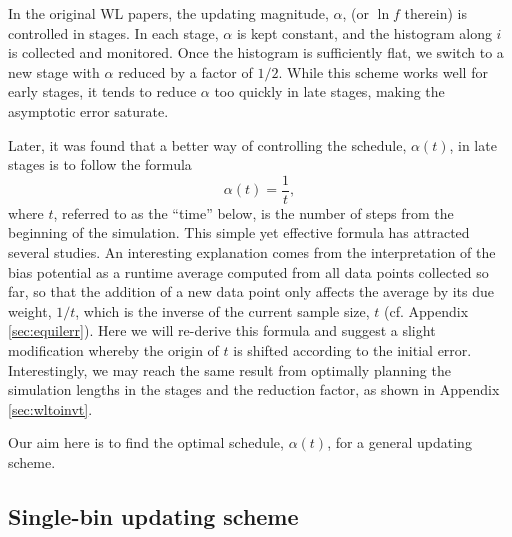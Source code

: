 \documentclass[reprint, superscriptaddress, floatfix]{revtex4-1}
\begin{document}
In the original WL papers\cite{
wang2001, *wang2001pre},
the updating magnitude, $\alpha$,
(or $\ln f$ therein)
is controlled in stages.
%
In each stage, $\alpha$
is kept constant,
and the histogram along $i$
is collected and monitored.
%
Once the histogram is sufficiently flat,
we switch to a new stage
with $\alpha$ reduced by a factor of $1/2$\cite{
wang2001, *wang2001pre}.
%
While this scheme works well for early stages,
%
it tends to reduce $\alpha$
too quickly in late stages, making the asymptotic error
saturate\cite{
belardinelli2007, *belardinelli2007jcp, *belardinelli2008, *belardinelli2016}.


Later,
it was found that
a better way
of controlling the schedule, $\alpha(t)$,
in late stages
is to follow the formula
%
\begin{equation}
  \alpha(t) = \frac{1}{t},
  \label{eq:alpha_invt}
\end{equation}
%
where $t$,
referred to as the ``time'' below,
is the number of steps
from the beginning of the simulation.
%
This simple yet effective formula has attracted
several studies\cite{
belardinelli2007, *belardinelli2007jcp, *belardinelli2008, *belardinelli2016,
morozov2007, zhou2008,
komura2012, *caparica2012, *caparica2014}.
%
An interesting explanation\cite{
  marsili2006, barducci2008}
comes from the interpretation of
the bias potential %
as a runtime average computed from all data points collected so far,
so that the addition of a new data point only
affects the average by its due weight, $1/t$,
which is the inverse of the current sample size, $t$
(cf. Appendix \ref{sec:equilerr}).
%
Here we will re-derive this formula
and suggest a slight modification
whereby the origin of $t$ is shifted
according to the initial error.
%
Interestingly, we may reach the same result
from optimally planning the simulation lengths in the stages
and the reduction factor, as shown in Appendix \ref{sec:wltoinvt}.


Our aim here is to find the optimal schedule, $\alpha(t)$,
for a general updating scheme.




\subsection{\label{sec:single-bin}
Single-bin updating scheme}
\end{document}
